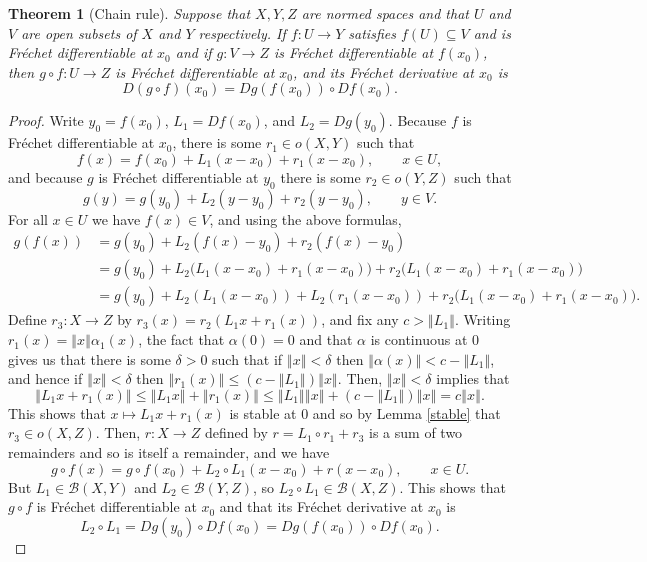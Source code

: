 \documentclass{article}
\newcommand{\norm}[1]{\left\Vert #1 \right\Vert}
\newtheorem{theorem}{Theorem}
\theoremstyle{definition}
\begin{document}
\begin{theorem}[Chain rule]
Suppose that $X,Y,Z$ are normed spaces and that $U$ and $V$ are open subsets of $X$ and $Y$ respectively.
If $f:U \to Y$ satisfies $f(U) \subseteq V$ and is Fr\'echet differentiable at $x_0$ and if  $g:V \to Z$ is Fr\'echet differentiable at $f(x_0)$, then
$g \circ f:U \to Z$ is Fr\'echet differentiable at $x_0$, and its Fr\'echet derivative at $x_0$ is
\[
D(g \circ f)(x_0) = Dg(f(x_0)) \circ Df(x_0).
\]
\label{chainrule}
\end{theorem}
\begin{proof}
Write $y_0=f(x_0)$,  $L_1=Df(x_0)$, and $L_2=Dg(y_0)$. Because $f$ is
Fr\'echet differentiable at $x_0$, there is some $r_1 \in o(X,Y)$
such that
\[
f(x)=f(x_0)+L_1(x-x_0) +r_1(x-x_0), \qquad x\in U,
\]
and because $g$ is Fr\'echet differentiable at $y_0$ there is some $r_2 \in o(Y,Z)$ such that
\[
g(y)=g(y_0)+L_2(y-y_0)+r_2(y-y_0), \qquad y \in V.
\]
For all $x \in U$ we have $f(x) \in V$, and using the above formulas,
\begin{align*}
g(f(x)) &= g(y_0) + L_2(f(x)-y_0)+r_2(f(x)-y_0)\\
&=g(y_0)+L_2\Big(L_1(x-x_0)+r_1(x-x_0)\Big)+r_2\Big(L_1(x-x_0)+r_1(x-x_0)\Big)\\
&=g(y_0)+L_2(L_1(x-x_0)) + L_2(r_1(x-x_0))  +r_2\Big(L_1(x-x_0)+r_1(x-x_0)\Big).
\end{align*}
Define $r_3:X \to Z$ by $r_3(x)=r_2(L_1 x + r_1(x))$, and fix any $c>\norm{L_1}$.
Writing $r_1(x)=\norm{x}\alpha_1(x)$, the fact that $\alpha(0)=0$ and that
$\alpha$ is continuous at $0$ gives us that
there is some $\delta>0$ such that if $\norm{x} < \delta$ then $\norm{\alpha(x)} < c-\norm{L_1}$, and hence if
$\norm{x} < \delta$ then $\norm{r_1(x)} \leq (c-\norm{L_1})\norm{x}$. Then, $\norm{x}<\delta$ implies that
\[
\norm{L_1x + r_1(x)} \leq \norm{L_1x}+\norm{r_1(x)} \leq \norm{L_1}\norm{x}+(c-\norm{L_1})\norm{x}=c\norm{x}.
\]
This shows that $x \mapsto L_1x + r_1(x)$ is stable at $0$ and so by Lemma \ref{stable} that $r_3 \in o(X,Z)$. 
Then, $r:X \to Z$ defined by $r=L_1 \circ r_1+r_3$ is a sum of two remainders and so is itself a remainder, and we have
\[
g \circ f(x) = g \circ f(x_0)+L_2 \circ L_1 (x-x_0)+r(x-x_0), \qquad x \in U.
\]
But $L_1 \in \mathscr{B}(X,Y)$ and $L_2 \in \mathscr{B}(Y,Z)$, so $L_2 \circ L_1 \in \mathscr{B}(X,Z)$. This shows
that
$g \circ f$ is Fr\'echet differentiable at $x_0$ and that its Fr\'echet derivative at $x_0$ is
\[
L_2 \circ L_1=Dg(y_0) \circ Df(x_0) = Dg(f(x_0)) \circ Df(x_0).
\]
\end{proof}
\end{document}
